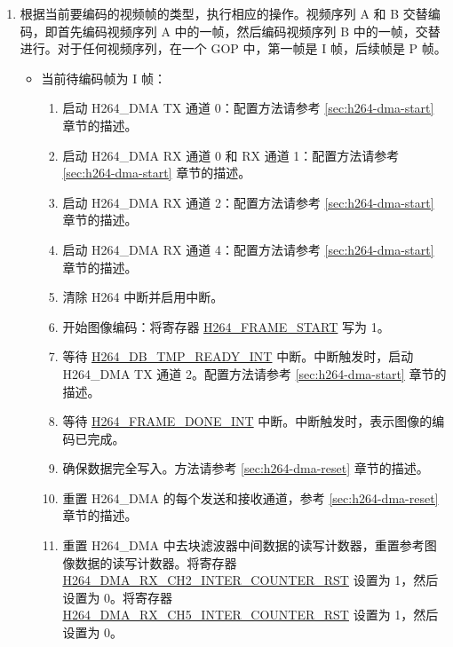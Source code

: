 \documentclass[main\_\_CN.tex]{subfiles}
\begin{document}
\begin{enumerate}
\begin{enumerate}
        \item 配置 H264\_DMA RX 通道 3。
        \item 配置 H264\_DMA RX 通道 4。
        \item 配置 H264\_DMA RX 通道 5。
    \end{enumerate}
    \item\label{item:h264-dual-frame} 根据当前要编码的视频帧的类型，执行相应的操作。视频序列 A 和 B 交替编码，即首先编码视频序列 A 中的一帧，然后编码视频序列 B 中的一帧，交替进行。对于任何视频序列，在一个 GOP 中，第一帧是 I 帧，后续帧是 P 帧。
    \begin{itemize}
        \item 当前待编码帧为 I 帧：
        \begin{enumerate}
            \item 启动 H264\_DMA TX 通道 0：配置方法请参考 \ref{sec:h264-dma-start} 章节的描述。
            \item 启动 H264\_DMA RX 通道 0 和 RX 通道 1：配置方法请参考 \ref{sec:h264-dma-start} 章节的描述。
            \item 启动 H264\_DMA RX 通道 2：配置方法请参考 \ref{sec:h264-dma-start} 章节的描述。
            \item 启动 H264\_DMA RX 通道 4：配置方法请参考 \ref{sec:h264-dma-start} 章节的描述。
            \item 清除 H264 中断并启用中断。
            \item 开始图像编码：将寄存器 \hyperref[fielddesc:H264FRAMESTART]{H264\_FRAME\_START} 写为 1。
            \item 等待 \hyperref[int:H264DBTMPREADYINT]{H264\_DB\_TMP\_READY\_INT} 中断。中断触发时，启动H264\_DMA TX 通道 2。配置方法请参考 \ref{sec:h264-dma-start} 章节的描述。
            \item 等待 \hyperref[int:H264FRAMEDONEINT]{H264\_FRAME\_DONE\_INT} 中断。中断触发时，表示图像的编码已完成。
            \item 确保数据完全写入。方法请参考 \ref{sec:h264-dma-reset} 章节的描述。
            \item 重置 H264\_DMA 的每个发送和接收通道，参考 \ref{sec:h264-dma-reset} 章节的描述。
            \item 重置 H264\_DMA 中去块滤波器中间数据的读写计数器，重置参考图像数据的读写计数器。将寄存器 \hyperref[fielddesc:H264DMARXCH2INTERCOUNTERRST]{H264\_DMA\_RX\_CH2\_INTER\_COUNTER\_RST} 设置为 1，然后设置为 0。将寄存器 \hyperref[fielddesc:H264DMARXCH5INTERCOUNTERRST]{H264\_DMA\_RX\_CH5\_INTER\_COUNTER\_RST} 设置为 1，然后设置为 0。

\end{enumerate}
\end{itemize}
\end{enumerate}
\end{document}
